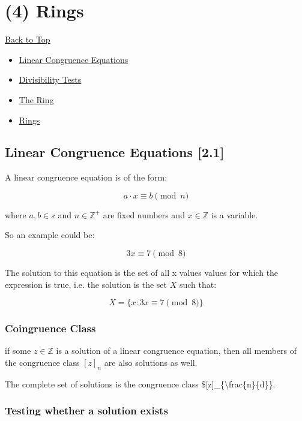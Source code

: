 \documentclass[
]{article}
\begin{document}
\hypertarget{header-n504}{%
\section{(4) Rings}\label{header-n504}}

\protect\hyperlink{antoc}{Back to Top}

\begin{itemize}
\item
  \protect\hyperlink{aaux284ux29lincon}{Linear Congruence Equations}
\item
  \protect\hyperlink{aaux284ux29divtest}{Divisibility Tests}
\item
  \href{aa(4)thering}{The Ring}
\item
  \protect\hyperlink{aaux284ux29rings}{Rings}
\end{itemize}

\hypertarget{header-n518}{%
\subsection{Linear Congruence Equations {[}2.1{]}}\label{header-n518}}

A linear congruence equation is of the form:

\[a\cdot x \equiv b \pmod{n}\]

where \(a,b \in \mathbb{z}\) and \(n \in \mathbb{Z}^+\) are fixed
numbers and \(x \in \mathbb{Z}\) is a variable.

So an example could be:

\[3x \equiv 7 \pmod{8}\]

The solution to this equation is the set of all x values values for
which the expression is true, i.e. the solution is the set \(X\) such
that:

\[X = \{x: 3x \equiv 7 \pmod{8} \}\]

\hypertarget{header-n528}{%
\subsubsection{Coingruence Class}\label{header-n528}}

if some \(z \in \mathbb{Z}\) is a solution of a linear congruence
equation, then all members of the congruence class \([z]_n\) are also
solutions as well.

The complete set of solutions is the congruence class
\${[}z{]}\_\{\textbackslash frac\{n\}\{d\}\}.

\hypertarget{header-n531}{%
\subsubsection{Testing whether a solution exists}\label{header-n531}}
\end{document}
